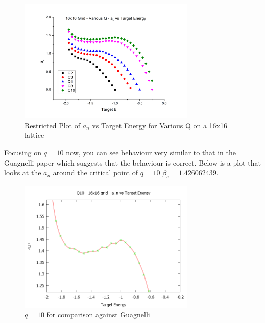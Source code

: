 \documentclass[10pt,a4paper]{article}
\begin{document}
\begin{figure}[h]
    \centering
    \includegraphics[width=0.75\textwidth]{variousq16x16.png}
    \caption{Restricted Plot of $a_n$ vs Target Energy for Various Q on a 16x16 lattice}
\end{figure}

Focusing on $q=10$ now, you can see behaviour very similar to that in the Guagnelli paper which suggests that the behaviour is correct.
Below is a plot that looks at the $a_n$ around the critical point of $q=10$ $\beta_c = 1.426062439$.
\begin{figure}[h!]
    \centering
    \includegraphics[width=0.75\textwidth]{q1016x16.png}
    \caption{$q=10$ for comparison against Guagnelli}
\end{figure}
\end{document}
